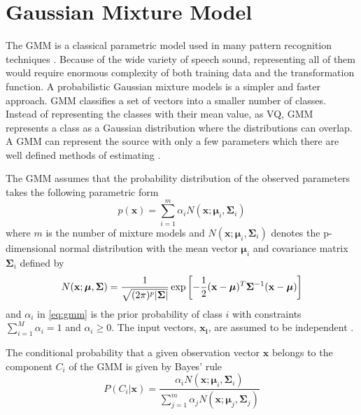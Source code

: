 \section{Gaussian Mixture Model} %
\label{sec:gaussian_mixture_model}
The GMM is a classical parametric model used in many pattern recognition techniques \cite{stylianou98}. Because of the wide variety of speech sound, representing all of them would require enormous complexity of both training data and the transformation function. A probabilistic Gaussian mixture models is a simpler and faster approach. GMM classifies a set of vectors into a smaller number of classes. Instead of representing the classes with their mean value, as VQ, GMM represents a class as a Gaussian distribution where the distributions can overlap. A GMM can represent the source with only a few parameters which there are well defined methods of estimating \cite{taletek}.

The GMM assumes that the probability distribution of the observed parameters takes the following parametric form
\begin{equation}
	\label{eq:gmm}
	p(\mathbf{x}) = \sum_{i=1}^{m} \alpha_i N(\mathbf{x}; \boldsymbol{\mu}_i, \mathbf{\Sigma}_i)
\end{equation}
where $m$ is the number of mixture models and $N(\mathbf{x}; \boldsymbol{\mu}_i, \mathbf{\Sigma}_i)$ denotes the p-dimensional normal distribution with the mean vector $\boldsymbol{\mu}_i$ and covariance matrix $\mathbf{\Sigma}_i$ defined by
\begin{equation}
	N(\mathbf{x}; \boldsymbol{\mu}, \mathbf{\Sigma}) = \frac{1}{\sqrt{(2\pi)^p\lvert\mathbf{\Sigma}\rvert}} \exp\left[ -\frac{1}{2} (\mathbf{x} -\boldsymbol{\mu})^T \mathbf{\Sigma}^{-1} (\mathbf{x} -\boldsymbol{\mu})\right]
\end{equation}
and $\alpha_i$ in \eqref{eq:gmm} is the prior probability of class $i$ with constraints $\sum_{i=1}^{M}\alpha_i = 1$ and $\alpha_i \geq 0$. The input vectors, $\mathbf{x_i}$, are assumed to be independent \cite{stylianou98}.

The conditional probability that a given observation vector $\mathbf{x}$ belongs to the component $C_i$ of the GMM is given by Bayes' rule \cite{statistikk}
\begin{equation}
	\label{eq:bayes}
	P(C_i\vert \mathbf{x}) = \frac{\alpha_i N(\mathbf{x}; \boldsymbol{\mu}_i, \mathbf{\Sigma}_i)}{\sum_{j=1}^{m}\alpha_j N(\mathbf{x}; \boldsymbol{\mu}_j, \mathbf{\Sigma}_j)}
\end{equation}

